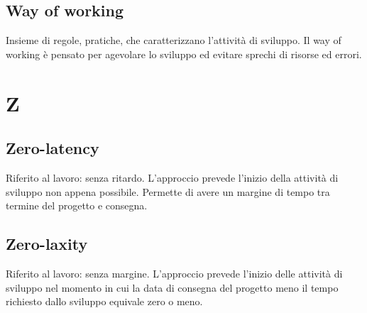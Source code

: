	\subsection{Way of working}
	\label{sec:wow}
	Insieme di regole, pratiche, che caratterizzano l'attività di sviluppo. Il way of working è pensato per agevolare lo sviluppo ed evitare sprechi di risorse ed errori. \newpage

	
	\section{Z}
	
	\subsection{Zero-latency}
	\label{sec:zerolatency}
	Riferito al lavoro: senza ritardo. L'approccio prevede l'inizio della attività di sviluppo non appena possibile. Permette di avere un margine di tempo tra termine del progetto e consegna.
	
	\subsection{Zero-laxity}
	\label{sec:zerolaxity}
	Riferito al lavoro: senza margine. L'approccio prevede l'inizio delle attività di sviluppo nel momento in cui la data di consegna del progetto meno il tempo richiesto dallo sviluppo equivale zero o meno. 
